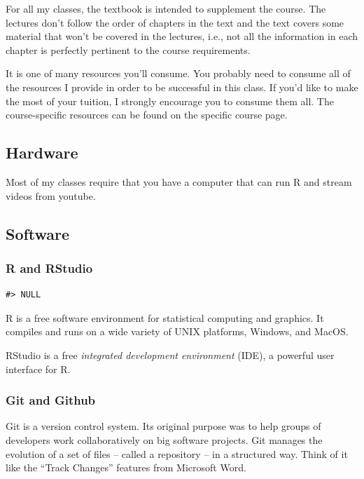 \documentclass[
]{book}
\begin{document}
For all my classes, the textbook is intended to supplement the course.
The lectures don't follow the order of chapters in the text and the text covers some material that won't be covered in the lectures, i.e., not all the information in each chapter is perfectly pertinent to the course requirements.

It is one of many resources you'll consume.
You probably need to consume all of the resources I provide in order to be successful in this class.
If you'd like to make the most of your tuition, I strongly encourage you to consume them all.
The course-specific resources can be found on the specific course page.

\hypertarget{hardware}{%
\subsection{Hardware}\label{hardware}}

Most of my classes require that you have a computer that can run R and stream videos from youtube.

\hypertarget{software}{%
\subsection{Software}\label{software}}

\hypertarget{r-and-rstudio}{%
\subsubsection{R and RStudio}\label{r-and-rstudio}}

\begin{verbatim}
#> NULL
\end{verbatim}

R is a free software environment for statistical computing and graphics. It compiles and runs on a wide variety of UNIX platforms, Windows, and MacOS.

RStudio is a free \emph{integrated development environment} (IDE), a powerful user interface for R.

\hypertarget{git-and-github}{%
\subsubsection{Git and Github}\label{git-and-github}}

Git is a version control system. Its original purpose was to help groups of developers work collaboratively on big software projects. Git manages the evolution of a set of files -- called a repository -- in a structured way. Think of it like the ``Track Changes'' features from Microsoft Word.
\end{document}
